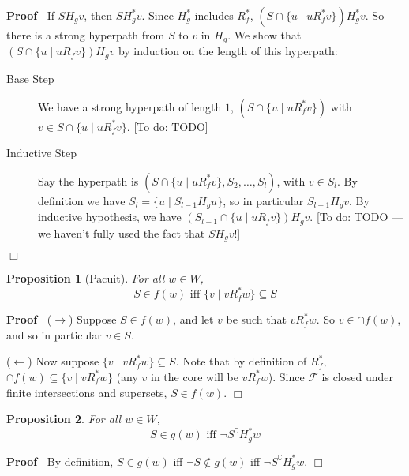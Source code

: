 \documentclass{article}
\newcommand{\infixiff}{\text{ iff }}
\newcommand{\nin}{\not\in}
\newcommand{\todo}[1]{{\color{red!75!black}[To do: #1]}}
\newenvironment{proof}{\noindent\textbf{Proof\ }}{\hspace*{\fill}$\Box$\medskip}
\newtheorem{proposition}{Proposition}
\providecommand{\infixiff}{\mathbin{\text{ iff }}}
\begin{document}
\begin{proof}
  If $S H_g v$, then $S H_g^{\ast} v$. Since $H_g^{\ast}$ includes
  $R_f^{\ast}$, $(S \cap \{ u \mid u R_f^{\ast} v \}) H_g^{\ast} v$. So there
  is a strong hyperpath from $S$ to $v$ in $H_g$. We show that $(S \cap \{ u
  \mid u R_f v \}) H_g v$ by induction on the length of this hyperpath:
  \begin{description}
    \item[Base Step] We have a strong hyperpath of length $1$, $(S \cap \{ u
    \mid u R^{\ast}_f v \})$ with $v \in S \cap \{ u \mid u R^{\ast}_f v \}$.
    {\todo{TODO}}
    
    \item[Inductive Step] Say the hyperpath is $(S \cap \{ u \mid u R^{\ast}_f
    v \}, S_2, \ldots, S_l)$, with $v \in S_l$. By definition we have $S_l =
    \{ u \mid S_{l - 1} H _g u \}$, so in particular $S_{l - 1} H_g v$. By
    inductive hypothesis, we have $(S_{l - 1} \cap \{ u \mid u R_f v \}) H_g
    v$. {\todo{TODO --- we haven't fully used the fact that $S H_g v$!}}
  \end{description}
  
\end{proof}

\begin{proposition}[Pacuit]
  \label{prop-R*-and-f}For all $w \in W$,
  \[ S \in f (w) \infixiff \{ v \mid v R^{\ast}_f w \} \subseteq S \]
\end{proposition}

\begin{proof}
  ($\rightarrow$) Suppose $S \in f (w)$, and let $v$ be such that $v
  R_f^{\ast} w$. So $v \in \cap f (w)$, and so in particular $v \in S$.
  
  ($\leftarrow$) Now suppose $\{ v \mid v R^{\ast}_f w \} \subseteq S$. Note
  that by definition of $R_f^{\ast}$, $\cap f (w) \subseteq \{ v \mid v
  R^{\ast}_f w \}$ (any $v$ in the core will be $v R_f^{\ast} w$). Since
  $\mathcal{F}$ is closed under finite intersections and supersets, $S \in f
  (w)$.
\end{proof}

\begin{proposition}
  \label{prop-H*-and-g}For all $w \in W$,
  \[ S \in g (w) \infixiff \neg S^{\complement} H_g^{\ast} w \]
\end{proposition}

\begin{proof}
  By definition, $S \in g (w)$ iff $\neg S \nin g (w)$ iff $\neg
  S^{\complement} H_g^{\ast} w$.
\end{proof}
\end{document}
